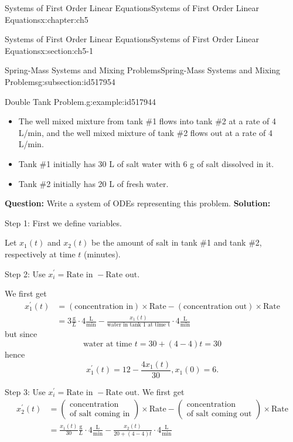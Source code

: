 \documentclass[oneside,10pt,]{book}
\newcommand{\terminology}[1]{\textbf{#1}}
\numberwithin{equation}{section}
\numberwithin{equation}{section}
\newcommand{\amp}{&}
\begin{document}
\begin{chapterptx}{Systems of First Order Linear Equations}{}{Systems of First Order Linear Equations}{}{}{x:chapter:ch5}
\begin{sectionptx}{Systems of First Order Linear Equations}{}{Systems of First Order Linear Equations}{}{}{x:section:ch5-1}
\begin{subsectionptx}{Spring-Mass Systems and Mixing Problems}{}{Spring-Mass Systems and Mixing Problems}{}{}{g:subsection:id517954}
\begin{example}{Double Tank Problem.}{g:example:id517944}
\begin{itemize}[label=\textbullet]
\item{}The well mixed mixture from tank \#1 flows into tank \#2 at a rate of 4 L\slash{}min, and the well mixed mixture of tank \#2 flows out at a rate of 4 L\slash{}min.%
\item{}Tank \#1 initially has 30 L of salt water with \(6\) g of salt dissolved in it.%
\item{}Tank \#2 initially has 20 L of fresh water.%
\end{itemize}
\terminology{Question:} Write a system of ODEs representing this problem. \terminology{Solution:}%
\par
Step 1: First we define variables.%
\par
Let \(x_{1}(t)\) and \(x_{2}(t)\)  be the amount of salt in tank \#1 and tank \#2, respectively at time \(t \)  (minutes).%
\par
Step 2: Use \(x_{i}^{\prime}=\text{Rate in }-\text{Rate out}\).%
\par
We first get%
\begin{align*}
x_{1}^{\prime}(t)  \amp =\left(\text{concentration in}\right)\times\text{Rate}-\left(\text{concentration out}\right)\times\text{Rate}   \\
\amp =3\frac{\text{g}}{L}\cdot4\frac{\text{L}}{\text{min}}-\frac{x_{1}(t)}{\text{water in tank 1 at time t}}\cdot 4\frac{\text{L}}{\text{min}}
\end{align*}
but since%
\begin{equation*}
\text{water at time }t=30+\left(4-4\right)t=30
\end{equation*}
hence%
\begin{equation*}
x_{1}^{\prime}(t) =12-\frac{4x_{1}(t)}{30},x_{1}(0)=6.
\end{equation*}
%
\par
Step 3: Use \(x_{i}^{\prime}=\text{Rate in }-\text{Rate out}\). We first get%
\begin{align*}
x_{2}^{\prime}(t)  \amp =\left(\begin{array}{c}
\mbox{concentration}\\
\mbox{of salt coming in}
\end{array}\right)\times\mbox{Rate}-\left(\begin{array}{c}
\mbox{concentration}\\
\mbox{of salt coming out}
\end{array}\right)\times\mbox{Rate}  \\
\amp =\frac{x_{1}(t)}{30}\frac{\text{g}}{L}\cdot4\frac{\text{L}}{\text{min}}-\frac{x_{2}(t)}{20+(4-4)t}\cdot4\frac{\text{L}}{\text{min}}\\

\end{align*}
\end{example}
\end{subsectionptx}
\end{sectionptx}
\end{chapterptx}
\end{document}
